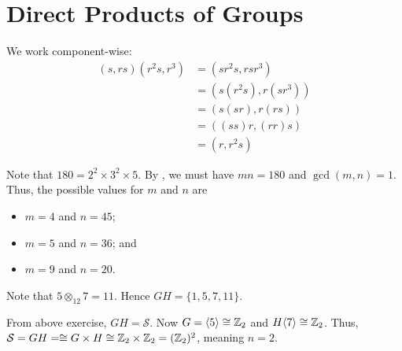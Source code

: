 \section{Direct Products of Groups}
\begin{questions}
    \item We work component-wise:
    \begin{align*}
        (s, rs)(r^2s, r^3) &= (sr^2s, rsr^3)\\
        &= (s(r^2s), r(sr^3))\\
        &= (s(sr), r(rs))\\
        &= ((ss)r, (rr)s)\\
        &= (r, r^2s)
    \end{align*}

    \item Note that $180 = 2^2 \times 3^2 \times 5$. By , we must have $mn = 180$ and $\gcd(m, n) = 1$. Thus, the possible values for $m$ and $n$ are
    \begin{itemize}
        \item $m = 4$ and $n = 45$;
        \item $m = 5$ and $n = 36$; and
        \item $m = 9$ and $n = 20$.
    \end{itemize}

    \item Note that $5 \otimes_{12} 7 = 11$. Hence $GH = \{1, 5, 7, 11\}$.

    \item From above exercise, $GH = \mathcal{S}$. Now $G = \langle 5 \rangle \cong \mathbb{Z}_2$ and $H \langle 7 \rangle \cong \mathbb{Z}_2$. Thus, $\mathcal{S} = GH = \cong G \times H \cong \mathbb{Z}_2 \times \mathbb{Z}_2 = (\mathbb{Z}_2)^2$, meaning $n = 2$.
\end{questions}
